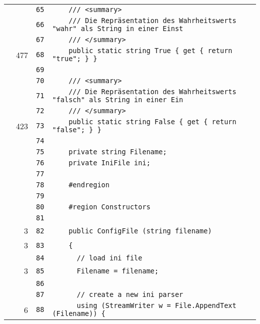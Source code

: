 \documentclass[a4paper,10pt]{article}
\begin{document}
\begin{longtable}[l]{lrrl}
\cellcolor{gray} &  & \verb~65~ & \verb~    /// <summary>~\\
\cellcolor{gray} &  & \verb~66~ & \verb~    /// Die Repräsentation des Wahrheitswerts "wahr" als String in einer Einst~\\
\cellcolor{gray} &  & \verb~67~ & \verb~    /// </summary>~\\
\cellcolor{green} & 477 & \verb~68~ & \verb~    public static string True { get { return "true"; } }~\\
\cellcolor{gray} &  & \verb~69~ & \verb~~\\
\cellcolor{gray} &  & \verb~70~ & \verb~    /// <summary>~\\
\cellcolor{gray} &  & \verb~71~ & \verb~    /// Die Repräsentation des Wahrheitswerts "falsch" als String in einer Ein~\\
\cellcolor{gray} &  & \verb~72~ & \verb~    /// </summary>~\\
\cellcolor{green} & 423 & \verb~73~ & \verb~    public static string False { get { return "false"; } }~\\
\cellcolor{gray} &  & \verb~74~ & \verb~~\\
\cellcolor{gray} &  & \verb~75~ & \verb~    private string Filename;~\\
\cellcolor{gray} &  & \verb~76~ & \verb~    private IniFile ini;~\\
\cellcolor{gray} &  & \verb~77~ & \verb~~\\
\cellcolor{gray} &  & \verb~78~ & \verb~    #endregion~\\
\cellcolor{gray} &  & \verb~79~ & \verb~~\\
\cellcolor{gray} &  & \verb~80~ & \verb~    #region Constructors~\\
\cellcolor{gray} &  & \verb~81~ & \verb~~\\
\cellcolor{green} & 3 & \verb~82~ & \verb~    public ConfigFile (string filename)~\\
\cellcolor{green} & 3 & \verb~83~ & \verb~    {~\\
\cellcolor{gray} &  & \verb~84~ & \verb~      // load ini file~\\
\cellcolor{green} & 3 & \verb~85~ & \verb~      Filename = filename;~\\
\cellcolor{gray} &  & \verb~86~ & \verb~~\\
\cellcolor{gray} &  & \verb~87~ & \verb~      // create a new ini parser~\\
\cellcolor{green} & 6 & \verb~88~ & \verb~      using (StreamWriter w = File.AppendText (Filename)) {~\\

\end{longtable}
\end{document}
